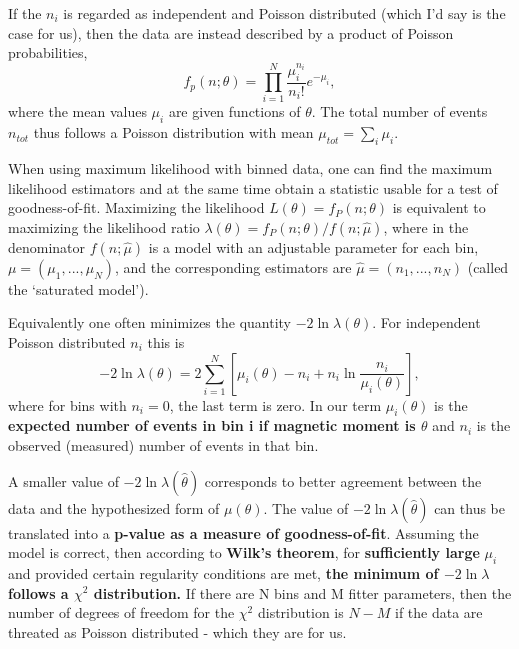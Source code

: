If the $n_i$ is regarded as independent and Poisson distributed (which I'd say is the case for us), then the data are instead described by a product of Poisson probabilities,
\begin{equation}
f_p\left(n;\theta\right)=\prod_{i=1}^{N} \frac{\mu_i^{n_i}}{n_i!}e^{-\mu_i},
\end{equation}
where the mean values $\mu_i$ are given functions of $\theta$. The total number of events $n_{tot}$ thus follows a Poisson distribution with mean $\mu_{tot}=\sum_i \mu_i$.

When using maximum likelihood with binned data, one can find the maximum likelihood estimators and at the same time obtain a statistic usable for a test of goodness-of-fit. Maximizing the likelihood $L\left(\theta\right)=f_P\left(n;\theta\right)$ is equivalent to maximizing the likelihood ratio $\lambda\left(\theta\right)=f_P\left(n;\theta\right) / f\left(n;\hat{\mu}\right)$, where in the denominator $f\left(n;\hat{\mu}\right)$ is a model with an adjustable parameter for each bin, $\mu=\left(\mu_1,...,\mu_N\right)$, and the corresponding estimators are $\hat{\mu}=\left(n_1,...,n_N\right)$ (called the `saturated model').

Equivalently one often minimizes the quantity $-2\ln\lambda\left(\theta\right)$. For independent Poisson distributed $n_i$ this is
\begin{equation}
-2\ln\lambda\left(\theta\right)=2\sum_{i=1}^{N}\left[\mu_i\left(\theta\right)-n_i+n_i\ln\frac{n_i}{\mu_i\left(\theta\right)}\right],
\end{equation}
where for bins with $n_i=0$, the last term is zero. In our term $\mu_i\left(\theta\right)$ is the \textbf{expected number of events in bin i if magnetic moment is $\theta$} and $n_i$ is the observed (measured) number of events in that bin.

A smaller value of $-2\ln\lambda\left(\hat{\theta}\right)$ corresponds to better agreement between the data and the hypothesized form of $\mu\left(\theta\right)$. The value of $-2\ln\lambda\left(\hat{\theta}\right)$ can thus be translated into a \textbf{p-value as a measure of goodness-of-fit}. Assuming the model is correct, then according to \textbf{Wilk's theorem}, for \textbf{sufficiently large} $\mu_i$ and provided certain regularity conditions are met, \textbf{the minimum of $-2\ln\lambda$ follows a $\chi^2$ distribution.} If there are N bins and M fitter parameters, then the number of degrees of freedom for the $\chi^2$ distribution is $N-M$ if the data are threated as Poisson distributed - which they are for us.

